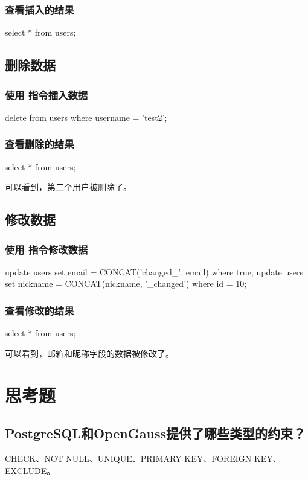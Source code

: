 \documentclass{ctexrep}
\begin{document}
\subsubsection{查看插入的结果}
\begin{run}
    select * from users;
\end{run}
\subsection{删除数据}
\subsubsection{使用  指令插入数据}
\begin{run}
    delete from users where username = 'test2';
\end{run}
\subsubsection{查看删除的结果}
\begin{run}
    select * from users;
\end{run}
可以看到，第二个用户被删除了。
\subsection{修改数据}
\subsubsection{使用  指令修改数据}
\begin{run}
    update users set email = CONCAT('changed_', email) where true;
    update users set nickname = CONCAT(nickname, '_changed') where id = 10;
\end{run}
\subsubsection{查看修改的结果}
\begin{run}
    select * from users;
\end{run}
可以看到，邮箱和昵称字段的数据被修改了。
\section{思考题}
\subsection*{PostgreSQL和OpenGauss提供了哪些类型的约束？}
CHECK、NOT NULL、UNIQUE、PRIMARY KEY、FOREIGN KEY、EXCLUDE。
\end{document}
